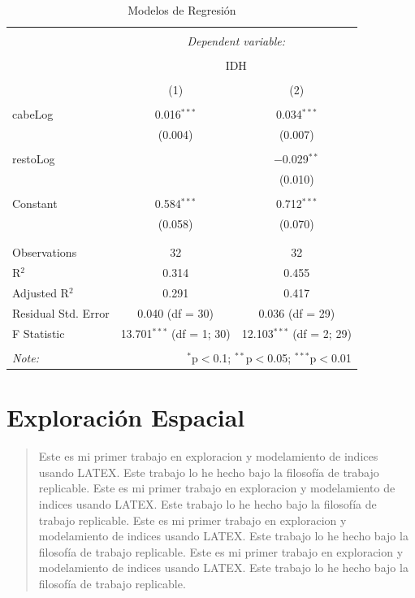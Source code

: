 \documentclass{article}
\begin{document}
\begin{table}[!htbp] \centering 
  \caption{Modelos de Regresión} 
  \label{regresiones} 
\begin{tabular}{@{\extracolsep{5pt}}lcc} 
\\[-1.8ex]\hline 
\hline \\[-1.8ex] 
 & \multicolumn{2}{c}{\textit{Dependent variable:}} \\ 
\cline{2-3} 
\\[-1.8ex] & \multicolumn{2}{c}{IDH} \\ 
\\[-1.8ex] & (1) & (2)\\ 
\hline \\[-1.8ex] 
 cabeLog & 0.016$^{***}$ & 0.034$^{***}$ \\ 
  & (0.004) & (0.007) \\ 
  & & \\ 
 restoLog &  & $-$0.029$^{**}$ \\ 
  &  & (0.010) \\ 
  & & \\ 
 Constant & 0.584$^{***}$ & 0.712$^{***}$ \\ 
  & (0.058) & (0.070) \\ 
  & & \\ 
\hline \\[-1.8ex] 
Observations & 32 & 32 \\ 
R$^{2}$ & 0.314 & 0.455 \\ 
Adjusted R$^{2}$ & 0.291 & 0.417 \\ 
Residual Std. Error & 0.040 (df = 30) & 0.036 (df = 29) \\ 
F Statistic & 13.701$^{***}$ (df = 1; 30) & 12.103$^{***}$ (df = 2; 29) \\ 
\hline 
\hline \\[-1.8ex] 
\textit{Note:}  & \multicolumn{2}{r}{$^{*}$p$<$0.1; $^{**}$p$<$0.05; $^{***}$p$<$0.01} \\ 
\end{tabular} 
\end{table} 

\clearpage
\section{Exploración Espacial}\label{espacial}
\begin{abstract}
Este es mi primer trabajo en exploracion y modelamiento de indices usando LATEX. Este trabajo lo he hecho bajo la filosofía de trabajo replicable. Este es mi primer trabajo en exploracion y modelamiento de indices usando LATEX. Este trabajo lo he hecho bajo la filosofía de trabajo replicable. Este es mi primer trabajo en exploracion y modelamiento de indices usando LATEX. Este trabajo lo he hecho bajo la filosofía de trabajo replicable. Este es mi primer trabajo en exploracion y modelamiento de indices usando LATEX. Este trabajo lo he hecho bajo la filosofía de trabajo replicable. \cite{gower_general_1971}
\end{abstract}
\end{document}
